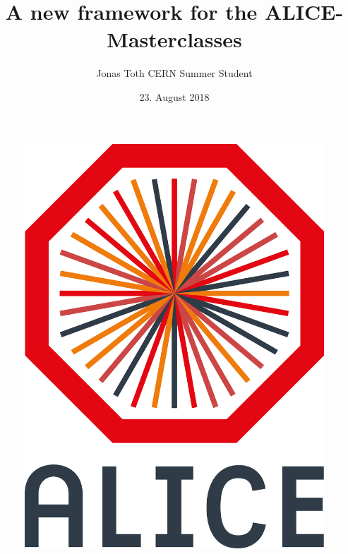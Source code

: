 \documentclass[aspectratio=169,14pt,dvipsnames]{beamer}
\title[Refactoring ALICE Masterclasses]{A new framework for the ALICE-Masterclasses}
\author[Jonas Toth, CERN Summer Student]{Jonas Toth \linebreak CERN Summer Student}
\date{23. August 2018}
\begin{document}
\begin{frame}
  \titlepage
  \vspace{-0.7cm}
  \begin{figure}
    \centering
    \includegraphics[height=0.3\textheight]{2012-Jul-04-4_Color_Logo_CB.png}\hspace{0cm}
  \end{figure}
\end{frame}
\end{document}
